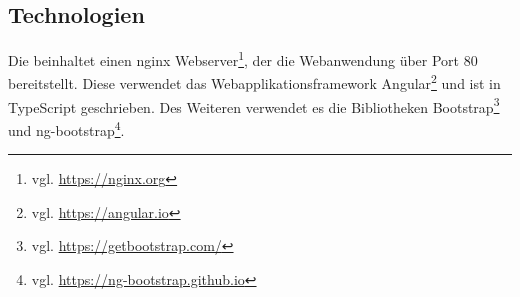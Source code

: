 \subsection{Technologien}
    Die {\webAppService} beinhaltet einen nginx Webserver\footnote{vgl. \url{https://nginx.org}},
    der die Webanwendung über Port 80 bereitstellt.
    Diese verwendet das Webapplikationsframework Angular\footnote{vgl. \url{https://angular.io}}
    und ist in TypeScript geschrieben.
    Des Weiteren verwendet es die Bibliotheken
    Bootstrap\footnote{vgl. \url{https://getbootstrap.com/}}
    und ng-bootstrap\footnote{vgl. \url{https://ng-bootstrap.github.io}}.
